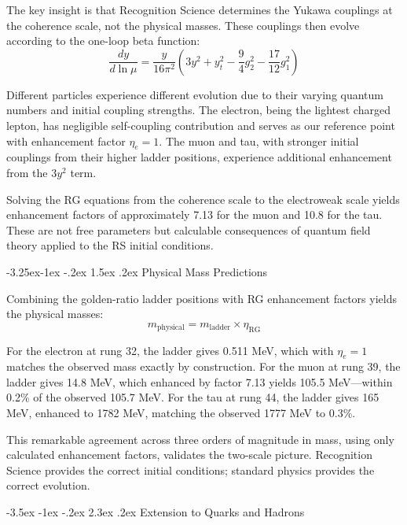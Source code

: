 \documentclass[11pt,a4paper]{article}
\makeatletter
\renewcommand\section{\@startsection{section}{1}{\z@}%
  {-3.5ex \@plus -1ex \@minus -.2ex}%
  {2.3ex \@plus.2ex}%
  {\normalfont\Large\bfseries\color{darkblue}}}
\renewcommand\subsection{\@startsection{subsection}{2}{\z@}%
  {-3.25ex\@plus -1ex \@minus -.2ex}%
  {1.5ex \@plus .2ex}%
  {\normalfont\large\bfseries\color{darkblue}}}
\theoremstyle{definition}
\makeatother
\begin{document}
The key insight is that Recognition Science determines the Yukawa couplings at the coherence scale, not the physical masses. These couplings then evolve according to the one-loop beta function:
\begin{equation}
\frac{dy}{d\ln\mu} = \frac{y}{16\pi^2}\left(3y^2 + y^2_t - \frac{9}{4}g_2^2 - \frac{17}{12}g_1^2\right)
\end{equation}

Different particles experience different evolution due to their varying quantum numbers and initial coupling strengths. The electron, being the lightest charged lepton, has negligible self-coupling contribution and serves as our reference point with enhancement factor $\eta_e = 1$. The muon and tau, with stronger initial couplings from their higher ladder positions, experience additional enhancement from the $3y^2$ term.

Solving the RG equations from the coherence scale to the electroweak scale yields enhancement factors of approximately 7.13 for the muon and 10.8 for the tau. These are not free parameters but calculable consequences of quantum field theory applied to the RS initial conditions.

\subsection{Physical Mass Predictions}

Combining the golden-ratio ladder positions with RG enhancement factors yields the physical masses:
\begin{equation}
m_{\text{physical}} = m_{\text{ladder}} \times \eta_{\text{RG}}
\end{equation}

For the electron at rung 32, the ladder gives 0.511 MeV, which with $\eta_e = 1$ matches the observed mass exactly by construction. For the muon at rung 39, the ladder gives 14.8 MeV, which enhanced by factor 7.13 yields 105.5 MeV—within 0.2\% of the observed 105.7 MeV. For the tau at rung 44, the ladder gives 165 MeV, enhanced to 1782 MeV, matching the observed 1777 MeV to 0.3\%.

This remarkable agreement across three orders of magnitude in mass, using only calculated enhancement factors, validates the two-scale picture. Recognition Science provides the correct initial conditions; standard physics provides the correct evolution.

\section{Extension to Quarks and Hadrons}
\end{document}
